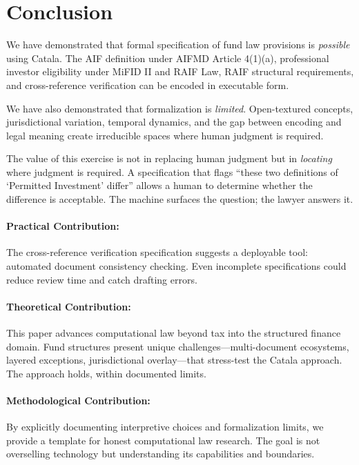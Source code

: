 
\section{Conclusion}
\label{sec:conclusion}

We have demonstrated that formal specification of fund law provisions is \textit{possible} using Catala. The AIF definition under AIFMD Article 4(1)(a), professional investor eligibility under MiFID II and RAIF Law, RAIF structural requirements, and cross-reference verification can be encoded in executable form.

We have also demonstrated that formalization is \textit{limited}. Open-textured concepts, jurisdictional variation, temporal dynamics, and the gap between encoding and legal meaning create irreducible spaces where human judgment is required.

The value of this exercise is not in replacing human judgment but in \textit{locating} where judgment is required. A specification that flags ``these two definitions of `Permitted Investment' differ'' allows a human to determine whether the difference is acceptable. The machine surfaces the question; the lawyer answers it.

\paragraph{Practical Contribution:} The cross-reference verification specification suggests a deployable tool: automated document consistency checking. Even incomplete specifications could reduce review time and catch drafting errors.

\paragraph{Theoretical Contribution:} This paper advances computational law beyond tax into the structured finance domain. Fund structures present unique challenges---multi-document ecosystems, layered exceptions, jurisdictional overlay---that stress-test the Catala approach. The approach holds, within documented limits.

\paragraph{Methodological Contribution:} By explicitly documenting interpretive choices and formalization limits, we provide a template for honest computational law research. The goal is not overselling technology but understanding its capabilities and boundaries.


